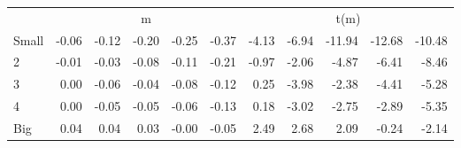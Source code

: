 \begin{table}[!ht]
\begin{tabular}{lrrrrrrrrrr}
  
     & \multicolumn{5}{c}{m} & \multicolumn{5}{c}{t(m)}   \\
     \cmidrule(r){2-6} \cmidrule(r){7-11} 
    Small  & -0.06  & -0.12  & -0.20  & -0.25  & -0.37  & -4.13  & -6.94  & -11.94  & -12.68  & -10.48   \\
    2  & -0.01  & -0.03  & -0.08  & -0.11  & -0.21  & -0.97  & -2.06  & -4.87  & -6.41  & -8.46   \\
    3  & 0.00  & -0.06  & -0.04  & -0.08  & -0.12  & 0.25  & -3.98  & -2.38  & -4.41  & -5.28   \\
    4  & 0.00  & -0.05  & -0.05  & -0.06  & -0.13  & 0.18  & -3.02  & -2.75  & -2.89  & -5.35   \\
    Big  & 0.04  & 0.04  & 0.03  & -0.00  & -0.05  & 2.49  & 2.68  & 2.09  & -0.24  & -2.14   \\
    
  
  \bottomrule
\end{tabular}
\label{tbl:25_Size_Var_F17}
\end{table}